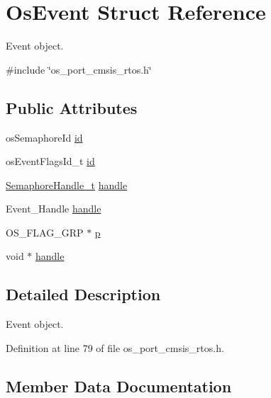 \hypertarget{structOsEvent}{}\section{Os\+Event Struct Reference}
\label{structOsEvent}


Event object.  




{\ttfamily \#include \char`\"{}os\+\_\+port\+\_\+cmsis\+\_\+rtos.\+h\char`\"{}}

\subsection*{Public Attributes}
\begin{DoxyCompactItemize}
\item 
os\+Semaphore\+Id \hyperlink{structOsEvent_a3444bc46bf8865f17612f50c9f355195}{id}
\item 
os\+Event\+Flags\+Id\+\_\+t \hyperlink{structOsEvent_a615dfc18e81f59d1718cee2055777d87}{id}
\item 
\hyperlink{semphr_8h_ad88c6df4a04beedeac782918c8a332f5}{Semaphore\+Handle\+\_\+t} \hyperlink{structOsEvent_a74866d5c892f4537896ffd435e055dcb}{handle}
\item 
Event\+\_\+\+Handle \hyperlink{structOsEvent_a27488f0b6374fe1217e12461193b9af0}{handle}
\item 
O\+S\+\_\+\+F\+L\+A\+G\+\_\+\+G\+RP $\ast$ \hyperlink{structOsEvent_aa8c2fd2730a7f70ca645deba365fb1e1}{p}
\item 
void $\ast$ \hyperlink{structOsEvent_a878f2b6d6d662f700c7e20ca429825eb}{handle}
\end{DoxyCompactItemize}


\subsection{Detailed Description}
Event object. 

Definition at line 79 of file os\+\_\+port\+\_\+cmsis\+\_\+rtos.\+h.



\subsection{Member Data Documentation}
\mbox{\label{structOsEvent_a878f2b6d6d662f700c7e20ca429825eb}} 

